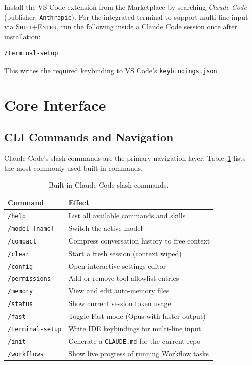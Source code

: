 Install the VS Code extension from the Marketplace by searching
\emph{Claude Code} (publisher: \texttt{Anthropic}).  For the integrated
terminal to support multi-line input via \textsc{Shift+Enter}, run the
following inside a Claude Code session once after installation:

\begin{verbatim}
/terminal-setup
\end{verbatim}

This writes the required keybinding to VS Code's \texttt{keybindings.json}.

\section{Core Interface}
\label{app:claude-code:interface}

\subsection{CLI Commands and Navigation}
\label{app:claude-code:cli}

Claude Code's slash commands are the primary navigation layer.
Table~\ref{tab:claude-code-slash} lists the most commonly used built-in
commands.

\begin{table}[ht]
\centering
\caption{Built-in Claude Code slash commands.}
\label{tab:claude-code-slash}
\begin{tabular}{ll}
\toprule
\textbf{Command} & \textbf{Effect} \\
\midrule
\texttt{/help}            & List all available commands and skills \\
\texttt{/model [name]}    & Switch the active model \\
\texttt{/compact}         & Compress conversation history to free context \\
\texttt{/clear}           & Start a fresh session (context wiped) \\
\texttt{/config}          & Open interactive settings editor \\
\texttt{/permissions}     & Add or remove tool allowlist entries \\
\texttt{/memory}          & View and edit auto-memory files \\
\texttt{/status}          & Show current session token usage \\
\texttt{/fast}            & Toggle Fast mode (Opus with faster output) \\
\texttt{/terminal-setup}  & Write IDE keybindings for multi-line input \\
\texttt{/init}            & Generate a \texttt{CLAUDE.md} for the current repo \\
\texttt{/workflows}       & Show live progress of running Workflow tasks \\
\bottomrule
\end{tabular}
\end{table}

